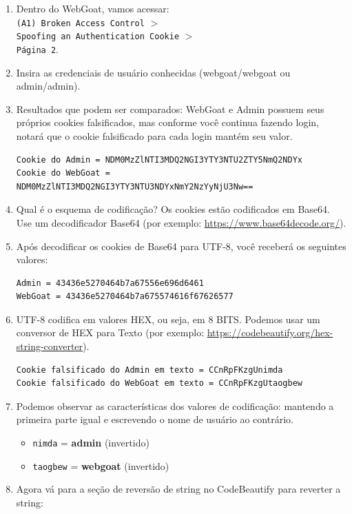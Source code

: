 \documentclass[11pt]{ifscarticle}
\begin{document}
\begin{enumerate}
    \item Dentro do WebGoat, vamos acessar: \\
        \texttt{(A1) Broken Access Control} $>$ \\
        \texttt{Spoofing an Authentication Cookie} $>$ \\
        \texttt{Página 2}.
    \item Insira as credenciais de usuário conhecidas (webgoat/webgoat ou admin/admin).
    \item Resultados que podem ser comparados: WebGoat e Admin possuem seus próprios cookies falsificados, mas conforme você continua fazendo login, notará que o cookie falsificado para cada login mantém seu valor.
\begin{lstlisting}[style=shell]
Cookie do Admin = NDM0MzZlNTI3MDQ2NGI3YTY3NTU2ZTY5NmQ2NDYx
Cookie do WebGoat = NDM0MzZlNTI3MDQ2NGI3YTY3NTU3NDYxNmY2NzYyNjU3Nw==
\end{lstlisting}
    \item Qual é o esquema de codificação? Os cookies estão codificados em Base64. Use um decodificador Base64 (por exemplo: \url{https://www.base64decode.org/}).
    \item Após decodificar os cookies de Base64 para UTF-8, você receberá os seguintes valores:
\begin{lstlisting}[style=shell]
Admin = 43436e5270464b7a67556e696d6461
WebGoat = 43436e5270464b7a675574616f67626577
\end{lstlisting}
    \item UTF-8 codifica em valores HEX, ou seja, em 8 BITS. Podemos usar um conversor de HEX para Texto (por exemplo: \url{https://codebeautify.org/hex-string-converter}).
\begin{lstlisting}[style=shell]
Cookie falsificado do Admin em texto = CCnRpFKzgUnimda
Cookie falsificado do WebGoat em texto = CCnRpFKzgUtaogbew
\end{lstlisting}
    \item Podemos observar as características dos valores de codificação: mantendo a primeira parte igual e escrevendo o nome de usuário ao contrário.
        \begin{itemize}
            \item \texttt{nimda} = \textbf{admin} (invertido)
            \item \texttt{taogbew} = \textbf{webgoat} (invertido)
        \end{itemize}
    \item Agora vá para a seção de reversão de string no CodeBeautify para reverter a string:

\end{enumerate}
\end{document}
